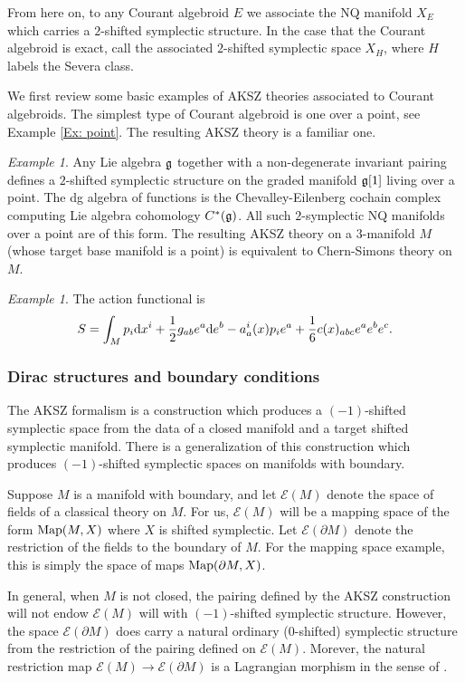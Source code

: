 \documentclass{article}
\newcommand{\cE}{\mathcal{E}}
\theoremstyle{definition}
\theoremstyle{remark}
\newtheorem{Ex}[theorem]{Example}
\begin{document}
From here on, to any Courant algebroid $E$ we associate the NQ manifold $X_E$ which carries a $2$-shifted symplectic structure. 
In the case that the Courant algebroid is exact, call the associated $2$-shifted symplectic space $X_H$, where $H$ labels the Severa class. 

We first review some basic examples of AKSZ theories associated to Courant algebroids. 
The simplest type of Courant algebroid is one over a point, see Example \ref{Ex: point}. 
The resulting AKSZ theory is a familiar one.

\begin{Ex}\label{ex: cs}
Any Lie algebra $\mathfrak{g}$ together with a non-degenerate invariant pairing defines a $2$-shifted symplectic structure on the graded manifold $\mathfrak{g}[1]$ living over a point. 
The dg algebra of functions is the Chevalley-Eilenberg cochain complex computing Lie algebra cohomology $C^*(\mathfrak{g})$. 
All such $2$-symplectic NQ manifolds over a point are of this form. 
The resulting AKSZ theory on a $3$-manifold $M$ (whose target base manifold is a point) is equivalent to Chern-Simons theory on $M$. 
\end{Ex}

\begin{Ex} \label{ex: exact CA}
The action functional is
\[
S = \int_M p_i {\rm d} x^i + \frac{1}{2} g_{ab} e^a {\rm d} e^b - a_a^i(x) p_i e^a + \frac{1}{6} c(x)_{abc} e^{a} e^b e^c .
\]
\end{Ex}
\subsubsection{Dirac structures and boundary conditions}

The AKSZ formalism is a construction which produces a $(-1)$-shifted symplectic space from the data of a closed manifold and a target shifted symplectic manifold. 
There is a generalization of this construction which produces $(-1)$-shifted symplectic spaces on manifolds with boundary. 

Suppose $M$ is a manifold with boundary, and let $\cE(M)$ denote the space of fields of a classical theory on $M$. 
For us, $\cE(M)$ will be a mapping space of the form ${\rm Map}(M, X)$ where $X$ is shifted symplectic. 
Let $\cE(\partial M)$ denote the restriction of the fields to the boundary of $M$. 
For the mapping space example, this is simply the space of maps ${\rm Map}(\partial M, X)$.

In general, when $M$ is not closed, the pairing defined by the AKSZ construction will not endow $\cE(M)$ will with $(-1)$-shifted symplectic structure. 
However, the space $\cE(\partial M)$ does carry a natural ordinary ($0$-shifted) symplectic structure from the restriction of the pairing defined on $\cE(M)$. 
Morever, the natural restriction map $\cE(M) \to \cE(\partial M)$ is a Lagrangian morphism in the sense of \cite{PTVV}. 
\end{document}
